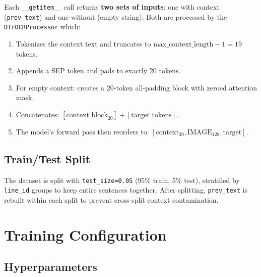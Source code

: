 \documentclass[11pt, a4paper]{article}
\begin{document}
Each \texttt{\_\_getitem\_\_} call returns \textbf{two sets of inputs}: one with context (\texttt{prev\_text}) and one without (empty string). Both are processed by the \texttt{DTrOCRProcessor} which:

\begin{enumerate}
    \item Tokenizes the context text and truncates to $\text{max\_context\_length} - 1 = 19$ tokens.
    \item Appends a SEP token and pads to exactly 20 tokens.
    \item For empty context: creates a 20-token all-padding block with zeroed attention mask.
    \item Concatenates: $[\text{context\_block}_{20}] + [\text{target\_tokens}]$.
    \item The model's forward pass then reorders to: $[\text{context}_{20}, \text{IMAGE}_{128}, \text{target}]$.
\end{enumerate}

\subsection{Train/Test Split}

The dataset is split with \texttt{test\_size=0.05} (95\% train, 5\% test), stratified by \texttt{line\_id} groups to keep entire sentences together. After splitting, \texttt{prev\_text} is rebuilt within each split to prevent cross-split context contamination.

\section{Training Configuration}

\subsection{Hyperparameters}
\end{document}
